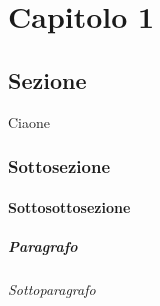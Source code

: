 

\chapter{Capitolo 1}
	
\section{Sezione} 

Ciaone

\subsection{Sottosezione}

\subsubsection{Sottosottosezione}

\paragraph{Paragrafo}

\subparagraph{Sottoparagrafo}


		
	
